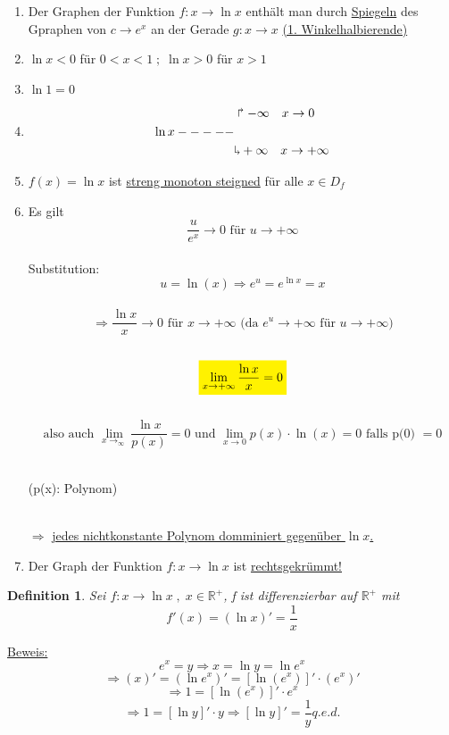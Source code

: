 \documentclass{scrbook}
\newcommand{\mathcolorbox}[2]{\colorbox{#1}{$\displaystyle #2$}}
\newtheorem{definition}{Definition}
\begin{document}
\begin{enumerate}

\item Der Graphen der Funktion $f: x\rightarrow \ln x $ enthält man durch \underline{Spiegeln} des Gpraphen von $ c \rightarrow e ^x $ an der Gerade $g: x \rightarrow x$ \underline{(1. Winkelhalbierende)}
\item $\ln x < 0 $ für $ 0 < x < 1 \; ; \; \ln x > 0 $ für $ x> 1$
\item $\ln 1 = 0$
\item 
\begin{align*}
&\Rsh -\infty \quad x \rightarrow 0
\\
\ln x  -----
\\
&\rotatebox[origin=c]{180}{$\Lsh$}+\infty \quad x \rightarrow +\infty
\end{align*}

\item $f(x) = \ln x$ ist \underline{streng monoton steigned} für alle $ x \in D_f$

\item Es gilt \[\frac u {e^x} \rightarrow 0 \text{ für } u \rightarrow +\infty\]
\\
Substitution: \[ u = \ln (x) \Rightarrow e^u = e^{\ln x} = x\]
\\
\[\Rightarrow \frac {\ln x}x \rightarrow 0  \text{ für } x \rightarrow +\infty \text{ (da }e^u \rightarrow +\infty \text{ für } u \rightarrow +\infty)\]
\\
\[ \mathcolorbox{yellow}{\lim_{x \to +\infty} \frac {\ln x }x = 0} \]
\\
\[ \text{also auch } \lim_{x\to _\infty} \frac {\ln x} {p(x)} = 0 \text{ und } \lim_{x \to 0} p(x) \cdot \ln(x) = 0 \text{ falls p(0) } = 0\]
\\
\centerline{(p(x): Polynom)}
\\
$\Rightarrow $ \underline{jedes nichtkonstante Polynom domminiert gegenüber $\ln x $.}

\item Der Graph der Funktion $ f:x \rightarrow \ln x $ ist \underline{rechtsgekrümmt!}

\end{enumerate}

\begin{definition}
Sei $ f: x \rightarrow \ln x \; , \; x \in \mathbb{R}^+$, f ist differenzierbar auf $\mathbb{R}^+$ mit 
\[ f'(x) = (\ln x)' = \frac 1 x\]
\end{definition}

\underline{Beweis: }
\[e^x = y \Rightarrow x = \ln y = \ln e^x\]
\[\Rightarrow (x)' = (\ln e^x)' = [\ln (e^x)]' \cdot (e^x)'\]
\[\Rightarrow 1 = [\ln (e^x)]' \cdot e^x\]
\[\Rightarrow 1 = [\ln y ]' \cdot y \Rightarrow [\ln y ]' = \frac 1 y q.e.d.\]
\end{document}
